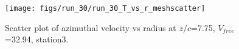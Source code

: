 \begin{figure}[H]
\centering
\texttt{[image: figs/run\_30/run\_30\_T\_vs\_r\_meshscatter]}
\caption{Scatter plot of azimuthal velocity vs radius at $z/c$=7.75, $V_{free}$=32.94, station3.}
\label{fig:run_30_T_vs_r_meshscatter}
\end{figure}


